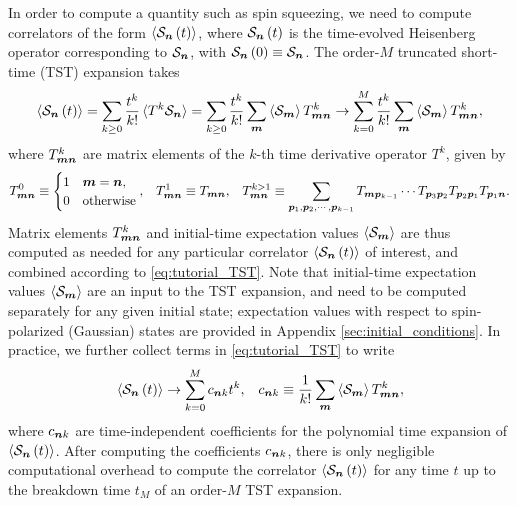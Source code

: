 In order to compute a quantity such as spin squeezing, we need to
compute correlators of the form $\braket{\mathcal{S}_{\bm n}\left( t \right)}$, where
$\mathcal{S}_{\bm n}\left( t \right)$ is the time-evolved Heisenberg operator corresponding
to $\mathcal{S}_{\bm n}$, with $\mathcal{S}_{\bm n}\left( 0 \right)\equiv\mathcal{S}_{\bm n}$.  The order-$M$
truncated short-time (TST) expansion takes
\begin{align}
  \braket{\mathcal{S}_{\bm n}\left( t \right)}
  = \sum_{k\ge0} \dfrac{t^k}{k!} \braket{T^k\mathcal{S}_{\bm n}}
  = \sum_{k\ge0} \dfrac{t^k}{k!}
  \sum_{\bm m} \braket{\mathcal{S}_{\bm m}} T^k_{\bm m\bm n}
  \to \sum_{k=0}^M \dfrac{t^k}{k!}
  \sum_{\bm m} \braket{\mathcal{S}_{\bm m}} T^k_{\bm m\bm n},
  \label{eq:tutorial_TST}
\end{align}
where $T^k_{\bm m\bm n}$ are matrix elements of the $k$-th time
derivative operator $T^k$, given by
\begin{align}
  T^0_{\bm m\bm n} \equiv
    \begin{cases}
      1 & \bm m = \bm n, \\
      0 & \text{otherwise}
    \end{cases},
  &&
  T^1_{\bm m\bm n} \equiv T_{\bm m\bm n},
  &&
  T^{k>1}_{\bm m\bm n}
  \equiv \sum_{\bm p_1,\bm p_2,\cdots,\bm p_{k-1}}
  T_{\bm m\bm p_{k-1}} \cdots T_{\bm p_3\bm p_2}
  T_{\bm p_2\bm p_1} T_{\bm p_1\bm n}.
\end{align}
Matrix elements $T^k_{\bm m\bm n}$ and initial-time expectation values
$\braket{\mathcal{S}_{\bm m}}$ are thus computed as needed for any particular
correlator $\braket{\mathcal{S}_{\bm n}\left( t \right)}$ of interest, and combined according
to \eqref{eq:tutorial_TST}.  Note that initial-time expectation values
$\braket{\mathcal{S}_{\bm m}}$ are an input to the TST expansion, and need to be
computed separately for any given initial state; expectation values
with respect to spin-polarized (Gaussian) states are provided in
Appendix \ref{sec:initial_conditions}.  In practice, we further
collect terms in \eqref{eq:tutorial_TST} to write
\begin{align}
  \braket{\mathcal{S}_{\bm n}\left( t \right)} \to \sum_{k=0}^M c_{\bm n k} t^k,
  &&
  c_{\bm n k}
  \equiv \dfrac{1}{k!} \sum_{\bm m} \braket{\mathcal{S}_{\bm m}} T^k_{\bm m\bm n},
  \label{eq:tutorial_corr}
\end{align}
where $c_{\bm n k}$ are time-independent coefficients for the
polynomial time expansion of $\braket{\mathcal{S}_{\bm n}\left( t \right)}$.  After computing
the coefficients $c_{\bm n k}$, there is only negligible computational
overhead to compute the correlator $\braket{\mathcal{S}_{\bm n}\left( t \right)}$ for any time
$t$ up to the breakdown time $t_M$ of an order-$M$ TST expansion.
